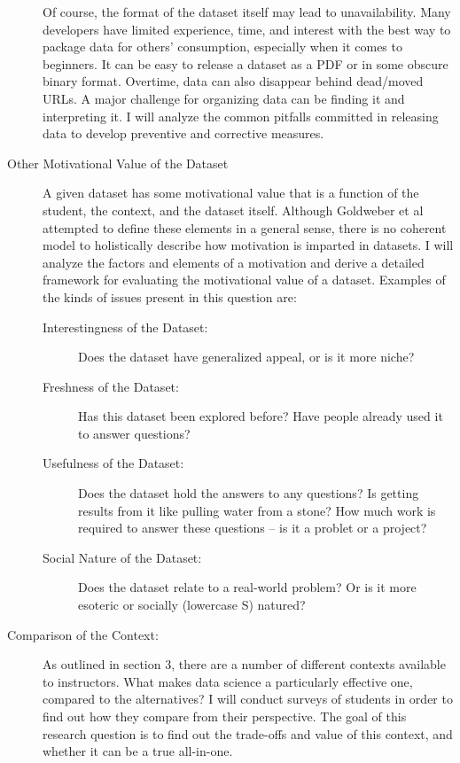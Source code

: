 \begin{description}
	Of course, the format of the dataset itself may lead to unavailability. Many developers have limited experience, time, and interest with the best way to package data for others' consumption, especially when it comes to beginners. It can be easy to release a dataset as a PDF or in some obscure binary format. Overtime, data can also disappear behind dead/moved URLs. A major challenge for organizing data can be finding it and interpreting it. I will analyze the common pitfalls committed in releasing data to develop preventive and corrective measures.
	\item[Other Motivational Value of the Dataset] A given dataset has some motivational value that is a function of the student, the context, and the dataset itself. Although Goldweber et al ~\cite{SocialGoodinComputingEducation} attempted to define these elements in a general sense, there is no coherent model to holistically describe how motivation is imparted in datasets. I will analyze the factors and elements of a motivation and derive a detailed framework for evaluating the motivational value of a dataset. Examples of the kinds of issues present in this question are:\begin{description}
		\item[Interestingness of the Dataset:] Does the dataset have generalized appeal, or is it more niche?
		\item[Freshness of the Dataset:] Has this dataset been explored before? Have people already used it to answer questions?
		\item[Usefulness of the Dataset:] Does the dataset hold the answers to any questions? Is getting results from it like pulling water from a stone? How much work is required to answer these questions -- is it a problet or a project?
		\item[Social Nature of the Dataset:] Does the dataset relate to a real-world problem? Or is it more esoteric or socially (lowercase S) natured?
	\end{description}
	\item[Comparison of the Context:] As outlined in section 3, there are a number of different contexts available to instructors. What makes data science a particularly effective one, compared to the alternatives? I will conduct surveys of students in order to find out how they compare from their perspective. The goal of this research question is to find out the trade-offs and value of this context, and whether it can be a true all-in-one.
\end{description}

